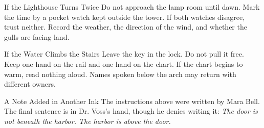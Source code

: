 \begin{fieldnote}{If the Lighthouse Turns Twice}
Do not approach the lamp room until dawn. Mark the time by a pocket watch
kept outside the tower. If both watches disagree, trust neither. Record the
weather, the direction of the wind, and whether the gulls are facing land.
\end{fieldnote}

\begin{fieldnote}{If the Water Climbs the Stairs}
Leave the key in the lock. Do not pull it free. Keep one hand on the rail
and one hand on the chart. If the chart begins to warm, read nothing aloud.
Names spoken below the arch may return with different owners.
\end{fieldnote}

\begin{fieldnote}{A Note Added in Another Ink}
The instructions above were written by Mara Bell. The final sentence is in
Dr. Voss's hand, though he denies writing it:
\textit{The door is not beneath the harbor. The harbor is above the door.}
\end{fieldnote}
